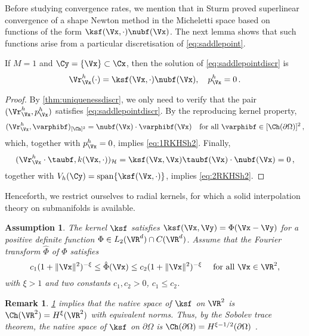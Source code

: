 \documentclass{siamart1116}
\newtheorem{remark}[theorem]{Remark}
\newtheorem{assumption}[theorem]{Assumption}
\numberwithin{theorem}{section}
\begin{document}
Before studying convergence rates, we mention that in \cite{sturm3}
Sturm proved superlinear convergence of a shape Newton method
in the Micheletti space based on functions
of the form $\ksf(\Vx,\cdot)\nubf(\Vx)$. The next lemma shows
that such functions arise from a particular discretisation of \cref{eq:saddlepoint}. 
\begin{proposition}
If $M=1$ and $\Cy=\{\Vx\}\subset\Cx$, then the solution of \cref{eq:saddlepointdiscr} is
$$
\Vr_\Vx^h(\cdot) = \ksf(\Vx,\cdot)\nubf(\Vx), \quad p^h_\Vx =0\,.
$$
\end{proposition}
\begin{proof}
By \cref{thm:uniquenessdiscr}, we only need to verify that the pair
$(\Vr_\Vx^h, p^h_\Vx)$ satisfies \cref{eq:saddlepointdiscr}.
By the reproducing kernel property,
\[ 
(\Vr_\Vx^h, \varphibf)_{[\Ch]^2} = \nubf(\Vx)\cdot \varphibf(\Vx)
\quad \text{for all } \varphibf \in [\Ch(\partial\Omega)]^2\,,
\]
which, together with $p^h_\Vx =0$, implies \cref{eq:1RKHSh2}.
Finally,
\begin{equation}
(\Vr^h_\Vx\cdot \taubf, k(\Vx, \cdot))_{\mathcal H}
= \ksf(\Vx, \Vx)\taubf(\Vx)\cdot \nubf(\Vx) = 0\,,
\end{equation}
together with  $V_h(\Cy) = \mathrm{span}\{\ksf(\Vx, \cdot)\}$, implies \cref{eq:2RKHSh2}.
\end{proof}

Henceforth, we restrict ourselves to radial kernels, 
for which a solid interpolation theory on submanifolds is available. 

\begin{assumption}\label{ass:radialkernel}
The kernel $\ksf$ satisfies $\ksf(\Vx,\Vy) = \Phi(\Vx-\Vy)$
for a positive definite function $\Phi\in L_2(\VR^d)\cap C(\VR^d)$.
Assume that the Fourier transform  $\hat \Phi$ of $\Phi$  satisfies
\begin{equation}\label{eq:fourier}
c_1 (1+\|\Vx\|^2)^{-\xi} \le  \hat \Phi(\Vx)  \le c_2 (1+\|\Vx\|^2)^{-\xi} \quad \text{ for all }\Vx\in \VR^2, 
\end{equation}
with $\xi >1$ and two constants $c_1,c_2>0$, $c_1\le c_2$. 
\end{assumption}
\begin{remark}
\cref{ass:radialkernel} implies that the native space of $\ksf$
on $\VR^2$ is $\Ch(\VR^2)=H^{\xi}(\VR^2)$ with equivalent norms. Thus, by the Sobolev trace theorem, the native space of $\ksf$ on $\partial\Omega$
is $\Ch(\partial\Omega)=H^{\xi-1/2}(\partial\Omega)$ \cite[Prop. 5]{FUWR12}.
\end{remark}
\end{document}
